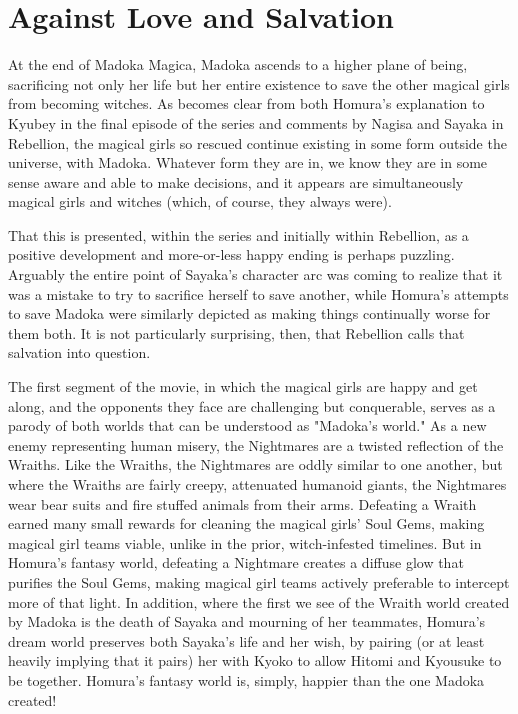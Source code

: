\chapter{Against Love and Salvation}
At the end of Madoka Magica, Madoka ascends to a higher plane of being, sacrificing not only her life but her entire existence to save the other magical girls from becoming witches. As becomes clear from both Homura's explanation to Kyubey in the final episode of the series and comments by Nagisa and Sayaka in Rebellion, the magical girls so rescued continue existing in some form outside the universe, with Madoka. Whatever form they are in, we know they are in some sense aware and able to make decisions, and it appears are simultaneously magical girls and witches (which, of course, they always were).

That this is presented, within the series and initially within Rebellion, as a positive development and more-or-less happy ending is perhaps puzzling. Arguably the entire point of Sayaka's character arc was coming to realize that it was a mistake to try to sacrifice herself to save another, while Homura's attempts to save Madoka were similarly depicted as making things continually worse for them both. It is not particularly surprising, then, that Rebellion calls that salvation into question.

The first segment of the movie, in which the magical girls are happy and get along, and the opponents they face are challenging but conquerable, serves as a parody of both worlds that can be understood as "Madoka's world." As a new enemy representing human misery, the Nightmares are a twisted reflection of the Wraiths. Like the Wraiths, the Nightmares are oddly similar to one another, but where the Wraiths are fairly creepy, attenuated humanoid giants, the Nightmares wear bear suits and fire stuffed animals from their arms. Defeating a Wraith earned many small rewards for cleaning the magical girls' Soul Gems, making magical girl teams viable, unlike in the prior, witch-infested timelines. But in Homura's fantasy world, defeating a Nightmare creates a diffuse glow that purifies the Soul Gems, making magical girl teams actively preferable to intercept more of that light. In addition, where the first we see of the Wraith world created by Madoka is the death of Sayaka and mourning of her teammates, Homura's dream world preserves both Sayaka's life and her wish, by pairing (or at least heavily implying that it pairs) her with Kyoko to allow Hitomi and Kyousuke to be together. Homura's fantasy world is, simply, happier than the one Madoka created!

